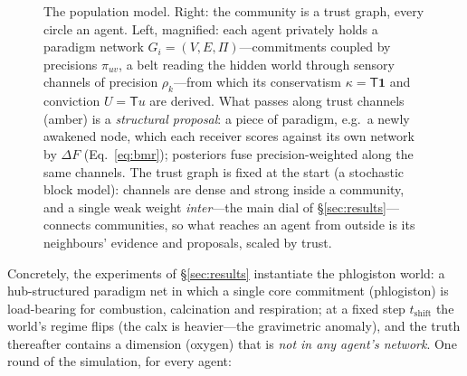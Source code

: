 \documentclass[runningheads]{llncs}
\newcommand{\Top}{\mathsf{T}}          %
\newcommand{\bone}{\mathbf{1}}         %
\begin{document}
\begin{figure}[h!]
{}
\caption{The population model. Right: the community is a trust graph, every circle an agent. Left,
magnified: each agent privately holds a paradigm network $G_i=(V,E,\Pi)$---commitments coupled by
precisions $\pi_{uv}$, a belt reading the hidden world through sensory channels of precision
$\rho_k$---from which its conservatism $\kappa=\Top\bone$ and conviction $U=\Top u$ are derived. What
passes along trust channels (amber) is a \emph{structural proposal}: a piece of paradigm, e.g.\ a
newly awakened node, which each receiver scores against its own network by $\Delta F$
(Eq.~\ref{eq:bmr}); posteriors fuse precision-weighted along the same channels. The trust graph is
fixed at the start (a stochastic block model): channels are dense and strong inside a community, and
a single weak weight \emph{inter}---the main dial of \S\ref{sec:results}---connects communities, so
what reaches an agent from outside is its neighbours' evidence and proposals, scaled by trust.}
\label{fig:population}
\end{figure}

Concretely, the experiments of \S\ref{sec:results} instantiate the phlogiston world: a hub-structured
paradigm net in which a single core commitment (phlogiston) is load-bearing for combustion,
calcination and respiration; at a fixed step $t_{\mathrm{shift}}$ the world's regime flips (the calx
is heavier---the gravimetric anomaly), and the truth thereafter contains a dimension (oxygen) that is
\emph{not in any agent's network}. One round of the simulation, for every agent:
\end{document}
